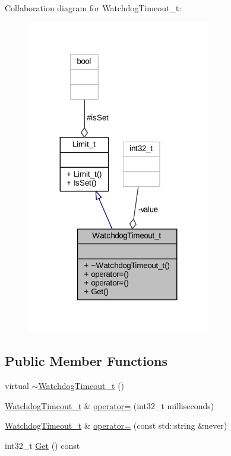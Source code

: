 Collaboration diagram for Watchdog\+Timeout\+\_\+t\+:
\nopagebreak
\begin{figure}[H]
\begin{center}
\leavevmode
\includegraphics[width=227pt]{class_watchdog_timeout__t__coll__graph}
\end{center}
\end{figure}
\subsection*{Public Member Functions}
\begin{DoxyCompactItemize}
\item 
virtual \hyperlink{class_watchdog_timeout__t_a7fc14aefcce57c3492aff11f2abfee89}{$\sim$\+Watchdog\+Timeout\+\_\+t} ()
\item 
\hyperlink{class_watchdog_timeout__t}{Watchdog\+Timeout\+\_\+t} \& \hyperlink{class_watchdog_timeout__t_ab60a00f4e6fa6ffc07c92ef55e1f2c6c}{operator=} (int32\+\_\+t milliseconds)
\item 
\hyperlink{class_watchdog_timeout__t}{Watchdog\+Timeout\+\_\+t} \& \hyperlink{class_watchdog_timeout__t_ae5ddca32690a6cdb5ddd96e08a4728ff}{operator=} (const std\+::string \&never)
\item 
int32\+\_\+t \hyperlink{class_watchdog_timeout__t_a4cb9de23c2305c8252af6ed91821b867}{Get} () const 
\end{DoxyCompactItemize}
